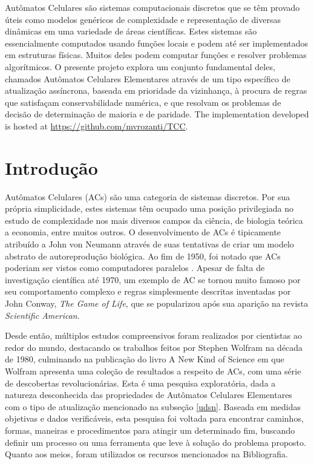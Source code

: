 \documentclass[a4paper,12pt]{ltxdoc}
\newcommand\tab[1][1cm]{\hspace*{#1}}
\begin{document}
\begin{resumo}
  Autômatos Celulares são sistemas computacionais discretos que se têm provado úteis como modelos genéricos de complexidade e representação de diversas dinâmicas em uma variedade de áreas científicas. Estes sistemas são essencialmente computados usando funções locais e podem até ser implementados em estruturas físicas. Muitos deles podem computar funções e resolver problemas algorítmicos. O presente projeto explora um conjunto fundamental deles, chamados Autômatos Celulares Elementares através de um tipo específico de atualização assíncrona, baseada em prioridade da vizinhança, à procura de regras que satisfaçam conservabilidade numérica, e que resolvam os problemas de decisão de determinação de maioria e de paridade.
  The implementation developed is hosted at \url{https://github.com/mvrozanti/TCC}.
\end{resumo}

\renewcommand{\contentsname}{\centerline{\Large Sumário}}

\section{Introdução}

Autômatos Celulares (ACs) são uma categoria de sistemas discretos. Por sua própria simplicidade, estes sistemas têm ocupado uma posição privilegiada no estudo de complexidade nos mais diversos campos da ciência, de biologia teórica a economia, entre muitos outros. O desenvolvimento de ACs é tipicamente atribuído a John von Neumann através de suas tentativas de criar um modelo abstrato de autoreprodução biológica. Ao fim de 1950, foi notado que ACs poderiam ser vistos como computadores paralelos \cite[p. 876]{wolfram2002new}. Apesar de falta de investigação científica até 1970, um exemplo de AC se tornou muito famoso por seu comportamento complexo e regras simplesmente descritas inventadas por John Conway, \textit{The Game of Life}, que se popularizou após sua aparição na revista \textit{Scientific American}. 

\tab Desde então, múltiplos estudos compreensivos foram realizados por cientistas ao redor do mundo, destacando os trabalhos feitos por Stephen Wolfram na década de 1980, culminando na publicação do livro A New Kind of Science em que Wolfram apresenta uma coleção de resultados a respeito de ACs, com uma série de descobertas revolucionárias.  
Esta é uma pesquisa exploratória, dada a natureza desconhecida das propriedades de Autômatos Celulares Elementares com o tipo de atualização mencionado na subseção \ref{udsn}. Baseada em medidas objetivas e dados verificáveis, esta pesquisa foi voltada para encontrar caminhos, formas, maneiras e procedimentos para atingir um determinado fim, buscando definir um processo ou uma ferramenta que leve à solução do problema proposto. Quanto aos meios, foram utilizados os recursos mencionados na Bibliografia.
\end{document}

